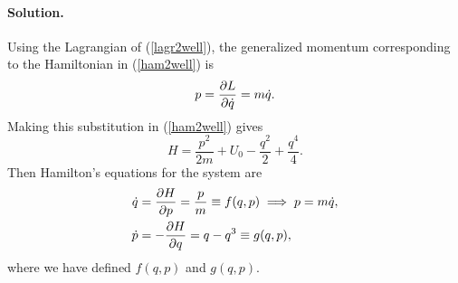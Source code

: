 \documentclass[11pt]{article}
\newcommand{\refeq}[1]{(\ref{#1})}
\newenvironment{solution}
{
    \paragraph{Solution.}
    \ignorespaces
}
{
    \bigskip
}
\begin{document}
\newcommand{\qdd}{\ddot{q}}
\newcommand{\pd}{\dot{p}}
\newcommand{\dlq}{\delta q}
\newcommand{\dlp}{\delta p}

\begin{solution}
	Using the Lagrangian of \refeq{lagr2well}, the generalized momentum corresponding to the Hamiltonian in \refeq{ham2well} is
	\begin{equation}
		p = \pdv{L}{\dot{q}} = m\dot{q}.
	\end{equation}
	Making this substitution in \refeq{ham2well} gives
	\begin{equation}
		H = \frac{p^2}{2m} + U_0 - \frac{q^2}{2} + \frac{q^4}{4}.
	\end{equation}
	Then Hamilton's equations for the system are
	\begin{align}
		\qd &= \pdv{H}{p} = \frac{p}{m} \equiv f(q, p) \implies p = m\qd, \label{qdot} \\
		\pd &= -\pdv{H}{q} = q - q^3 \equiv g(q, p), \label{pdot}
	\end{align}
	where we have defined $f(q, p)$ and $g(q, p)$.
	

\end{solution}
\end{document}
